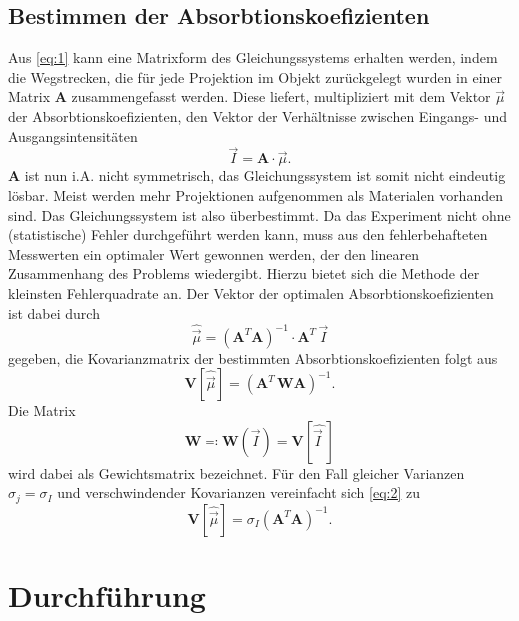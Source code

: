 \subsection{Bestimmen der Absorbtionskoefizienten}
Aus \eqref{eq:1} kann eine Matrixform des Gleichungssystems erhalten werden, indem
die Wegstrecken, die für jede Projektion im Objekt zurückgelegt wurden in einer
Matrix $\mathbf{A}$ zusammengefasst werden.
Diese liefert, multipliziert mit dem Vektor
$\vec{\mu}$ der Absorbtionskoefizienten, den Vektor der Verhältnisse zwischen
Eingangs- und Ausgangsintensitäten
\begin{equation}
  \vec{I} = \mathbf{A} \cdot \vec{\mu}.
\end{equation}
$\mathbf{A}$ ist nun i.A. nicht symmetrisch, das Gleichungssystem ist somit nicht
eindeutig lösbar.
Meist werden mehr Projektionen aufgenommen als Materialen vorhanden sind.
Das Gleichungssystem ist also überbestimmt.
Da das Experiment nicht ohne (statistische) Fehler durchgeführt werden kann,
muss aus den fehlerbehafteten Messwerten ein optimaler Wert gewonnen werden, der
den linearen Zusammenhang des Problems wiedergibt.
Hierzu bietet sich die Methode der kleinsten Fehlerquadrate an.
Der Vektor der optimalen Absorbtionskoefizienten ist dabei durch
\begin{equation}
  \hat{\vec{\mu}} = \left(\mathbf{A}^{T} \mathbf{A} \right)^{-1} \cdot \mathbf{A}^{T} \, \vec{I}
\end{equation}
gegeben, die Kovarianzmatrix der bestimmten Absorbtionskoefizienten folgt aus
\begin{equation}
  \label{eq:2}
  \mathbf{V} \left[ \hat{\vec{\mu}} \right] = \left(\mathbf{A}^{T} \, \mathbf{W} \mathbf{A} \right)^{-1}.
\end{equation}
Die Matrix
\begin{equation}
  \mathbf{W} \eqcolon \mathbf{W} \left(\vec{I} \right) = \mathbf{V}\left[\hat{\vec{I}\:\!}\right]
\end{equation}
wird dabei als Gewichtsmatrix bezeichnet.
Für den Fall gleicher Varianzen $\sigma_{j} = \sigma_{I}$ und verschwindender
Kovarianzen vereinfacht sich \eqref{eq:2} zu
\begin{equation}
  \mathbf{V}\left[\hat{\vec{\mu}}\right] = \sigma_{I} \left(\mathbf{A}^{T} \mathbf{A} \right)^{-1}.
\end{equation}


\section{Durchführung}
